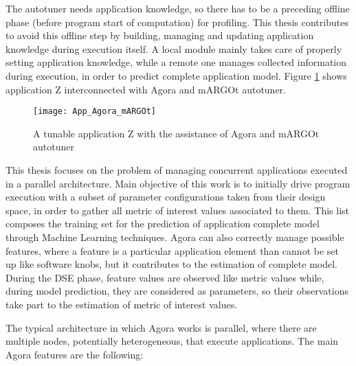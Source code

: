 The autotuner needs application knowledge, so there has to be a preceding offline phase (before program start of computation) for profiling. This thesis contributes to avoid this offline step by building, managing and updating application knowledge during execution itself. A local module mainly takes care of properly setting application knowledge, while a remote one manages collected information during execution, in order to predict complete application model. Figure \ref{fig::appAGORA} shows application Z interconnected with Agora and mARGOt autotuner.

\begin{figure}[htb]

    \centering
    \texttt{[image: App\_Agora\_mARGOt]}
    \caption{A tunable application Z with the assistance of Agora and mARGOt autotuner}
    \label{fig::appAGORA}
    
\end{figure}

This thesis focuses on the problem of managing concurrent applications executed in a parallel architecture. Main objective of this work is to initially drive program execution with a subset of parameter configurations taken from their design space, in order to gather all metric of interest values associated to them. This list composes the training set for the prediction of application complete model through Machine Learning techniques. Agora can also correctly manage possible features, where a feature is a particular application element than cannot be set up like software knobs, but it contributes to the estimation of complete model. During the DSE phase, feature values are observed like metric values while, during model prediction, they are considered as parameters, so their observations take part to the estimation of metric of interest values.

The typical architecture in which Agora works is parallel, where there are multiple nodes, potentially heterogeneous, that execute applications. The main Agora features are the following:

